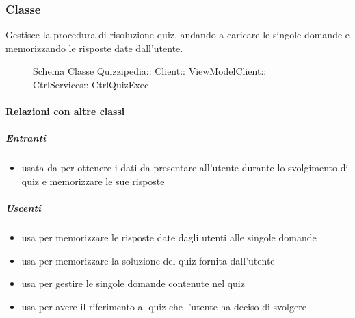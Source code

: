 \subsubsection{Classe }
Gestisce la procedura di risoluzione quiz, andando a caricare le singole domande e memorizzando le risposte date dall'utente.
\begin{figure}[H]
\centering
\noindent{}
\caption[Schema Classe CtrlQuizExec]{Schema Classe Quizzipedia:: Client:: ViewModelClient:: CtrlServices:: CtrlQuizExec}
\end{figure}
\paragraph{Relazioni con altre classi}
\subparagraph{Entranti}
\begin{itemize}
\item usata da  per ottenere i dati da presentare all'utente durante lo svolgimento di quiz e memorizzare le sue risposte
\end{itemize}
\subparagraph{Uscenti}
\begin{itemize}
\item usa  per memorizzare le risposte date dagli utenti alle singole domande
\item usa  per memorizzare la soluzione del quiz fornita dall'utente
\item usa  per gestire le singole domande contenute nel quiz
\item usa  per avere il riferimento al quiz che l'utente ha deciso di svolgere
\end{itemize}
